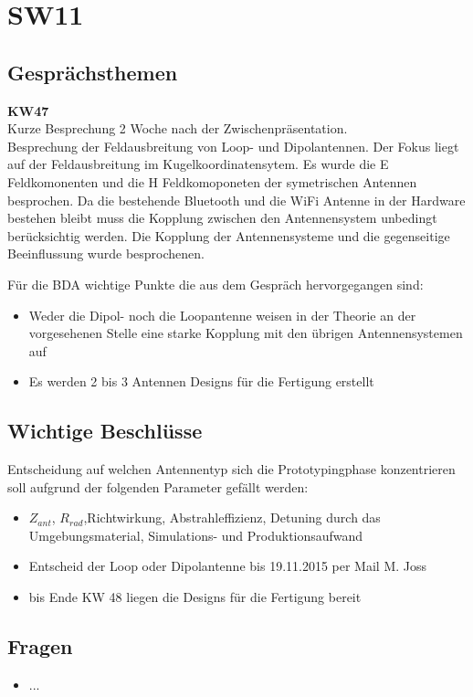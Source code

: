 \documentclass[10pt,a4paper]{article}
\begin{document}
\section*{SW11}

\subsection*{Gesprächsthemen}

\textbf{KW47}\\
Kurze Besprechung 2 Woche nach der Zwischenpräsentation.\\


Besprechung der Feldausbreitung von Loop- und Dipolantennen. Der Fokus liegt auf der Feldausbreitung im Kugelkoordinatensytem. Es wurde die E Feldkomonenten und die H Feldkomoponeten der symetrischen Antennen besprochen. Da die bestehende Bluetooth und die WiFi Antenne in der Hardware bestehen bleibt muss die Kopplung zwischen den Antennensystem unbedingt berücksichtig werden. Die Kopplung der Antennensysteme und die gegenseitige Beeinflussung wurde besprochenen. 

\vspace{10 mm}
Für die BDA wichtige Punkte die aus dem Gespräch hervorgegangen sind:
\begin{itemize}
	\item Weder die Dipol- noch die Loopantenne weisen in der Theorie an der vorgesehenen Stelle eine starke Kopplung mit den übrigen Antennensystemen auf
	\item Es werden 2 bis 3 Antennen Designs für die Fertigung erstellt
	
\end{itemize}

\subsection*{Wichtige Beschlüsse}
Entscheidung auf welchen Antennentyp sich die Prototypingphase konzentrieren soll aufgrund der folgenden Parameter gefällt werden:
\begin{itemize}
	\item $Z_{ant}$, $R_{rad}$,Richtwirkung, Abstrahleffizienz, Detuning durch das Umgebungsmaterial, Simulations- und Produktionsaufwand
	\item Entscheid der Loop oder Dipolantenne bis 19.11.2015 per Mail M. Joss
	\item bis Ende KW 48 liegen die Designs für die Fertigung bereit
\end{itemize}
\subsection*{Fragen}
\begin{itemize}
	\item ...
\end{itemize}
\end{document}
